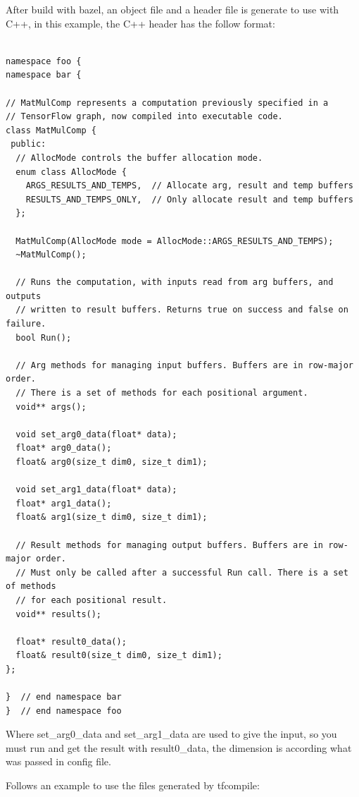 \documentclass[11pt,openany]{book}
\begin{document}
After build with bazel, an object file and a header file is generate to use with C++, in this example, the C++ header has the follow format:

\begin{verbatim}

namespace foo {
namespace bar {

// MatMulComp represents a computation previously specified in a
// TensorFlow graph, now compiled into executable code.
class MatMulComp {
 public:
  // AllocMode controls the buffer allocation mode.
  enum class AllocMode {
    ARGS_RESULTS_AND_TEMPS,  // Allocate arg, result and temp buffers
    RESULTS_AND_TEMPS_ONLY,  // Only allocate result and temp buffers
  };

  MatMulComp(AllocMode mode = AllocMode::ARGS_RESULTS_AND_TEMPS);
  ~MatMulComp();

  // Runs the computation, with inputs read from arg buffers, and outputs
  // written to result buffers. Returns true on success and false on failure.
  bool Run();

  // Arg methods for managing input buffers. Buffers are in row-major order.
  // There is a set of methods for each positional argument.
  void** args();

  void set_arg0_data(float* data);
  float* arg0_data();
  float& arg0(size_t dim0, size_t dim1);

  void set_arg1_data(float* data);
  float* arg1_data();
  float& arg1(size_t dim0, size_t dim1);

  // Result methods for managing output buffers. Buffers are in row-major order.
  // Must only be called after a successful Run call. There is a set of methods
  // for each positional result.
  void** results();

  float* result0_data();
  float& result0(size_t dim0, size_t dim1);
};

}  // end namespace bar
}  // end namespace foo
\end{verbatim}

Where set\_arg0\_data and set\_arg1\_data are used to give the input, so you must run and get the result with result0\_data, the dimension is according what was passed in config file.

Follows an example to use the files generated by tfcompile:
\end{document}
